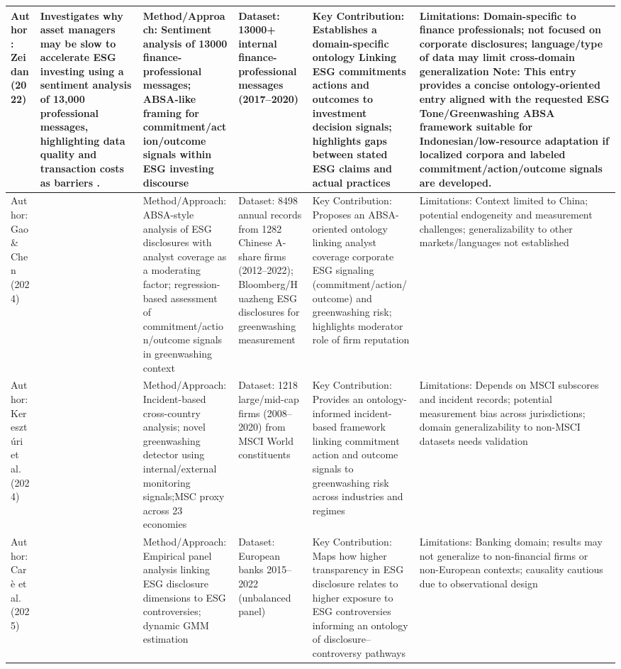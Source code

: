 \documentclass{article}
\begin{document}
\begin{landscape}
\begin{longtable}{p{1.8cm}
p{2.6cm}
p{3.4cm}
p{2.6cm}
p{3.5cm}
p{3.5cm}}
Author: Zeidan (2022) & Investigates why asset managers may be slow to accelerate ESG investing using a sentiment analysis of 13,000 professional messages, highlighting data quality and transaction costs as barriers  \parencite{rodrigo_zeidan_780f3cd1}. & Method/Approach: Sentiment analysis of 13000 finance-professional messages; ABSA-like framing for commitment/action/outcome signals within ESG investing discourse & Dataset: 13000+ internal finance-professional messages (2017–2020) & Key Contribution: Establishes a domain-specific ontology Linking ESG commitments actions and outcomes to investment decision signals; highlights gaps between stated ESG claims and actual practices & Limitations: Domain-specific to finance professionals; not focused on corporate disclosures; language/type of data may limit cross-domain generalization Note: This entry provides a concise ontology-oriented entry aligned with the requested ESG Tone/Greenwashing ABSA framework suitable for Indonesian/low-resource adaptation if localized corpora and labeled commitment/action/outcome signals are developed. \\ \hline
Author: Gao \& Chen (2024) & ~ & Method/Approach: ABSA-style analysis of ESG disclosures with analyst coverage as a moderating factor; regression-based assessment of commitment/action/outcome signals in greenwashing context & Dataset: 8498 annual records from 1282 Chinese A-share firms (2012–2022); Bloomberg/Huazheng ESG disclosures for greenwashing measurement & Key Contribution: Proposes an ABSA-oriented ontology linking analyst coverage corporate ESG signaling (commitment/action/outcome) and greenwashing risk; highlights moderator role of firm reputation & Limitations: Context limited to China; potential endogeneity and measurement challenges; generalizability to other markets/languages not established \\ \hline
Author: Keresztúri et al. (2024) & ~ & Method/Approach: Incident-based cross-country analysis; novel greenwashing detector using internal/external monitoring signals;MSC proxy across 23 economies & Dataset: 1218 large/mid-cap firms (2008–2020) from MSCI World constituents & Key Contribution: Provides an ontology-informed incident-based framework linking commitment action and outcome signals to greenwashing risk across industries and regimes & Limitations: Depends on MSCI subscores and incident records; potential measurement bias across jurisdictions; domain generalizability to non-MSCI datasets needs validation \\ \hline
Author: Carè et al. (2025) & ~ & Method/Approach: Empirical panel analysis linking ESG disclosure dimensions to ESG controversies; dynamic GMM estimation & Dataset: European banks 2015–2022 (unbalanced panel) & Key Contribution: Maps how higher transparency in ESG disclosure relates to higher exposure to ESG controversies informing an ontology of disclosure–controversy pathways & Limitations: Banking domain; results may not generalize to non-financial firms or non-European contexts; causality cautious due to observational design \\ \hline

\end{longtable}
\end{landscape}
\end{document}
